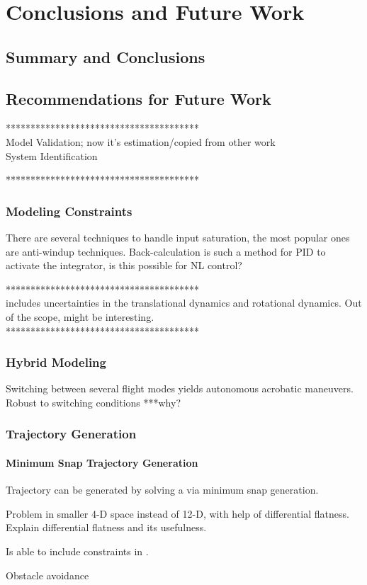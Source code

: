 \chapter{Conclusions and Future Work}\label{ch:conclusion}
\section{Summary and Conclusions}

\section{Recommendations for Future Work}\label{ch:future}
***************************************\\
Model Validation; now it's estimation/copied from other work\\ 
System Identification

***************************************\\
\subsection{Modeling Constraints}
There are several techniques to handle input saturation, the most popular ones are anti-windup techniques. Back-calculation is such a method for PID to activate the integrator, is this possible for NL control?

***************************************\\
\cite{Goodarzi2013a} includes uncertainties in the translational dynamics and rotational dynamics. Out of the scope, might be interesting.\\
***************************************\\

\subsection{Hybrid Modeling}
Switching between several flight modes yields autonomous acrobatic maneuvers. Robust to switching conditions ***why?\\
\cite{Tang2014}

\subsection{Trajectory Generation}
\subsubsection{Minimum Snap Trajectory Generation}

Trajectory can be generated by solving a  via minimum snap generation.

Problem in smaller 4-D space instead of 12-D, with help of differential flatness. Explain differential flatness and its usefulness.

Is able to include constraints in .

\cite{Mellinger2011}

Obstacle avoidance